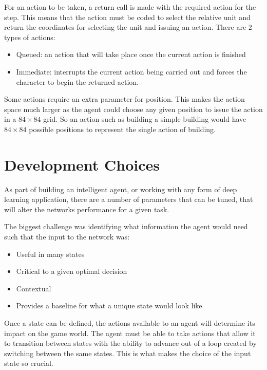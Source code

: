 For an action to be taken, a return call is made with the required action for the step.
This means that the action must be coded to select the relative unit and return the coordinates
for selecting the unit and issuing an action. There are 2 types of actions:

\begin{itemize}
    \item Queued: an action that will take place once the current
        action is finished
    \item Immediate: interrupts the current action being carried out and
        forces the character to begin the returned action.
\end{itemize}

Some actions require an extra parameter for position.
This makes the action space much larger as the agent could choose any given
position to issue the action in a $84 \times 84$ grid.
So an action such as building a simple building would have $84 \times 84$
possible positions to represent the single action of building.

\section{Development Choices}

As part of building an intelligent agent, or working with any form of deep learning application,
there are a number of parameters that can be tuned, that will alter the networks performance
for a given task.

The biggest challenge was identifying what information the agent would need such that the
input to the network was:

\begin{itemize}
    \item Useful in many states
    \item Critical to a given optimal decision
    \item Contextual
    \item Provides a baseline for what a unique state would look like
\end{itemize}

Once a state can be defined, the actions available to an agent will determine its
impact on the game world. The agent must be able to take actions that allow it to
transition between states with the ability to advance out of a loop created
by switching between the same states. This is what makes the choice of the input
state so crucial.

